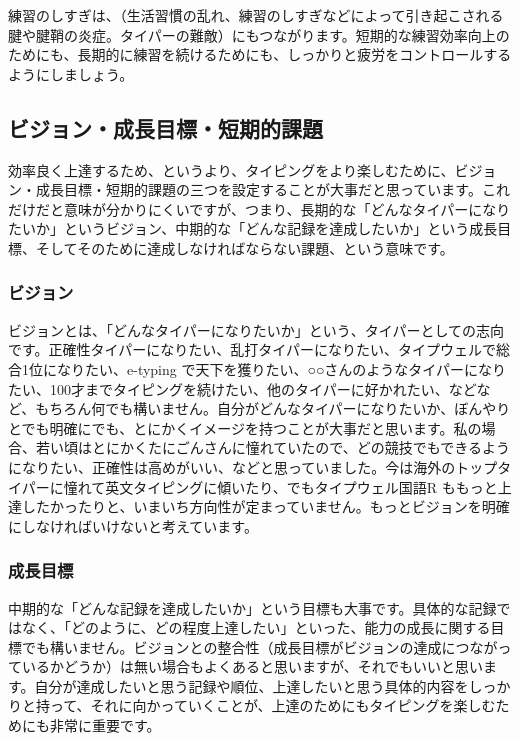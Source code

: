 練習のしすぎは、（生活習慣の乱れ、練習のしすぎなどによって引き起こされる腱や腱鞘の炎症。タイパーの難敵）にもつながります。短期的な練習効率向上のためにも、長期的に練習を続けるためにも、しっかりと疲労をコントロールするようにしましょう。

\subsection{ビジョン・成長目標・短期的課題}

効率良く上達するため、というより、タイピングをより楽しむために、ビジョン・成長目標・短期的課題の三つを設定することが大事だと思っています。これだけだと意味が分かりにくいですが、つまり、長期的な「どんなタイパーになりたいか」というビジョン、中期的な「どんな記録を達成したいか」という成長目標、そしてそのために達成しなければならない課題、という意味です。

\subsubsection*{ビジョン}

ビジョンとは、「どんなタイパーになりたいか」という、タイパーとしての志向です。正確性タイパーになりたい、乱打タイパーになりたい、タイプウェルで総合1位になりたい、e-typing で天下を獲りたい、○○さんのようなタイパーになりたい、100才までタイピングを続けたい、他のタイパーに好かれたい、などなど、もちろん何でも構いません。自分がどんなタイパーになりたいか、ぼんやりとでも明確にでも、とにかくイメージを持つことが大事だと思います。私の場合、若い頃はとにかくたにごんさんに憧れていたので、どの競技でもできるようになりたい、正確性は高めがいい、などと思っていました。今は海外のトップタイパーに憧れて英文タイピングに傾いたり、でもタイプウェル国語R ももっと上達したかったりと、いまいち方向性が定まっていません。もっとビジョンを明確にしなければいけないと考えています。

\subsubsection*{成長目標}

中期的な「どんな記録を達成したいか」という目標も大事です。具体的な記録ではなく、「どのように、どの程度上達したい」といった、能力の成長に関する目標でも構いません。ビジョンとの整合性（成長目標がビジョンの達成につながっているかどうか）は無い場合もよくあると思いますが、それでもいいと思います。自分が達成したいと思う記録や順位、上達したいと思う具体的内容をしっかりと持って、それに向かっていくことが、上達のためにもタイピングを楽しむためにも非常に重要です。

